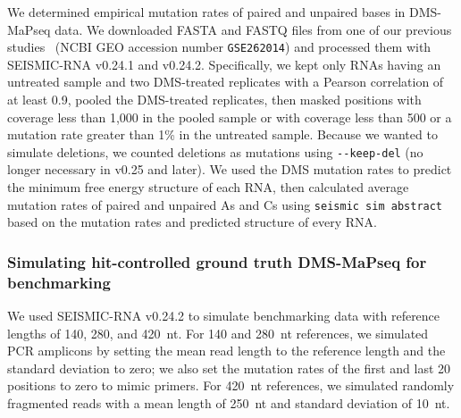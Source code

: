 \documentclass[unnumsec,webpdf,contemporary,large]{oup-authoring-template}%
\theoremstyle{thmstyleone}%
\theoremstyle{thmstyletwo}%
\theoremstyle{thmstylethree}%
\begin{document}
We determined empirical mutation rates of paired and unpaired bases in DMS-MaPseq data.
We downloaded FASTA and FASTQ files from one of our previous studies~\cite{deLajarte2024} (NCBI GEO accession number \verb|GSE262014|) and processed them with SEISMIC-RNA v0.24.1 and v0.24.2.
Specifically, we kept only RNAs having an untreated sample and two DMS-treated replicates with a Pearson correlation of at least 0.9, pooled the DMS-treated replicates, then masked positions with coverage less than 1,000 in the pooled sample or with coverage less than 500 or a mutation rate greater than 1\% in the untreated sample.
Because we wanted to simulate deletions, we counted deletions as mutations using \verb|--keep-del| (no longer necessary in v0.25 and later).
We used the DMS mutation rates to predict the minimum free energy structure of each RNA, then calculated average mutation rates of paired and unpaired As and Cs using \verb|seismic sim abstract| based on the mutation rates and predicted structure of every RNA.

\subsubsection{Simulating hit-controlled ground truth DMS-MaPseq for benchmarking}
\label{sim-dms}

We used SEISMIC-RNA v0.24.2 to simulate benchmarking data with reference lengths of 140, 280, and 420~nt.
For 140 and 280~nt references, we simulated PCR amplicons by setting the mean read length to the reference length and the standard deviation to zero; we also set the mutation rates of the first and last 20 positions to zero to mimic primers.
For 420~nt references, we simulated randomly fragmented reads with a mean length of 250~nt and standard deviation of 10~nt.
\end{document}
